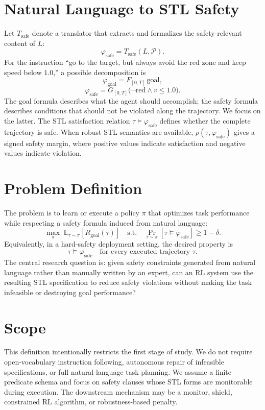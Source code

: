 \documentclass[letterpaper,10pt,twocolumn]{article}
\begin{document}
\section{Natural Language to STL Safety}
Let $T_{\mathrm{safe}}$ denote a translator that extracts and formalizes the safety-relevant content of $L$:
\[
\varphi_{\mathrm{safe}} = T_{\mathrm{safe}}(L,\mathcal{P}).
\]
For the instruction ``go to the target, but always avoid the red zone and keep speed below $1.0$,'' a possible decomposition is
\[
\varphi_{\mathrm{goal}} = F_{[0,T]}\,\mathrm{goal},
\]
\[
\varphi_{\mathrm{safe}} =
G_{[0,T]}\bigl(\neg \mathrm{red} \wedge v \leq 1.0\bigr).
\]
The goal formula describes what the agent should accomplish; the safety formula describes conditions that should not be violated along the trajectory. We focus on the latter. The STL satisfaction relation $\tau \models \varphi_{\mathrm{safe}}$ defines whether the complete trajectory is safe. When robust STL semantics are available, $\rho(\tau,\varphi_{\mathrm{safe}})$ gives a signed safety margin, where positive values indicate satisfaction and negative values indicate violation.

\section{Problem Definition}
The problem is to learn or execute a policy $\pi$ that optimizes task performance while respecting a safety formula induced from natural language:
\[
\max_{\pi}\; \mathbb{E}_{\tau \sim \pi}\left[R_{\mathrm{goal}}(\tau)\right]
\quad
\text{s.t.}\quad
\Pr_{\tau \sim \pi}\left[\tau \models \varphi_{\mathrm{safe}}\right] \geq 1-\delta .
\]
Equivalently, in a hard-safety deployment setting, the desired property is
\[
\tau \models \varphi_{\mathrm{safe}}
\quad \text{for every executed trajectory } \tau .
\]
The central research question is: given safety constraints generated from natural language rather than manually written by an expert, can an RL system use the resulting STL specification to reduce safety violations without making the task infeasible or destroying goal performance?

\section{Scope}
This definition intentionally restricts the first stage of study. We do not require open-vocabulary instruction following, autonomous repair of infeasible specifications, or full natural-language task planning. We assume a finite predicate schema and focus on safety clauses whose STL forms are monitorable during execution. The downstream mechanism may be a monitor, shield, constrained RL algorithm, or robustness-based penalty.
\end{document}
